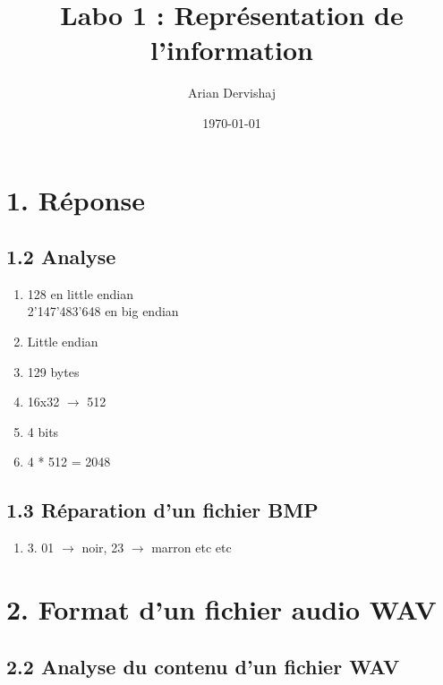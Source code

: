 \documentclass[a4paper, 12pt]{article}
\title{Labo 1 : Représentation de l'information}
\author{Arian Dervishaj}
\date{\today}
\begin{document}
\maketitle
\section*{1. Réponse}
\subsection*{1.2 Analyse}
\begin{enumerate}
    \item 128 en little endian\\ 
          2'147'483'648 en big endian
    \item Little endian
    \item 129 bytes
    \item 16x32 $\rightarrow$ 512
    \item 4 bits
    \item 4 * 512 = 2048

\end{enumerate}

\subsection*{1.3 Réparation d'un fichier BMP}
\begin{enumerate}
  \item[] 3. 01 $\rightarrow$ noir, 23 $\rightarrow$ marron etc etc

\end{enumerate}

\section*{2. Format d'un fichier audio WAV}
\subsection*{2.2 Analyse du contenu d'un fichier WAV}
\end{document}
